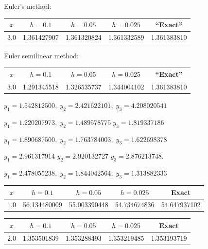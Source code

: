 {\small Euler's method:
\begin{tabular}{|c|r|r|r|r|}
\hline
\multicolumn{1}{|c|}{$x$}&
\multicolumn{1}{|c|}{$h=0.1$}&
\multicolumn{1}{|c|}{$h=0.05$}&
\multicolumn{1}{|c|}{$h=0.025$}&
\multicolumn{1}{|c|}{``Exact''}\\ \hline
3.0 & 1.361427907 & 1.361320824 & 1.361332589 & 1.361383810 \\
\hline
\end{tabular}}

\bigskip

\hspace{.75in}
{\small Euler semilinear method:
\begin{tabular}{|c|r|r|r|r|}
\hline
\multicolumn{1}{|c|}{$x$}&
\multicolumn{1}{|c|}{$h=0.1$}&
\multicolumn{1}{|c|}{$h=0.05$}&
\multicolumn{1}{|c|}{$h=0.025$}&
\multicolumn{1}{|c|}{``Exact''}\\ \hline
3.0 & 1.291345518 & 1.326535737 & 1.344004102 & 1.361383810 \\
\hline
\end{tabular}}


$y_1=1.542812500,\; y_2=2.421622101,\; y_3=4.208020541$

$y_1=1.220207973,\; y_2=1.489578775\; y_3=1.819337186$

$y_1=1.890687500,\; y_2=1.763784003,\; y_3=1.622698378$

$y_1=2.961317914$\; $y_2=2.920132727$\; $y_3=2.876213748$.

$y_1=2.478055238,\; y_2=1.844042564,\; y_3=1.313882333$

\bigskip
{}
{\small
{}
\begin{tabular}{|c|r|r|r|r|}\hline
\multicolumn{1}{|c|}{$x$}&
\multicolumn{1}{|c|}{$h=0.1$}&
\multicolumn{1}{|c|}{$h=0.05$}&
\multicolumn{1}{|c|}{$h=0.025$}&
\multicolumn{1}{|c|}{Exact}\\ \hline
1.0 & 56.134480009 & 55.003390448 & 54.734674836 &  54.647937102 \\
\hline
\end{tabular}}

\bigskip
{}
{\small
{}
\begin{tabular}{|c|r|r|r|r|}\hline
\multicolumn{1}{|c|}{$x$}&
\multicolumn{1}{|c|}{$h=0.1$}&
\multicolumn{1}{|c|}{$h=0.05$}&
\multicolumn{1}{|c|}{$h=0.025$}&
\multicolumn{1}{|c|}{Exact}\\ \hline
2.0 & 1.353501839 & 1.353288493 & 1.353219485 & 1.353193719\\
\hline
\end{tabular}}

